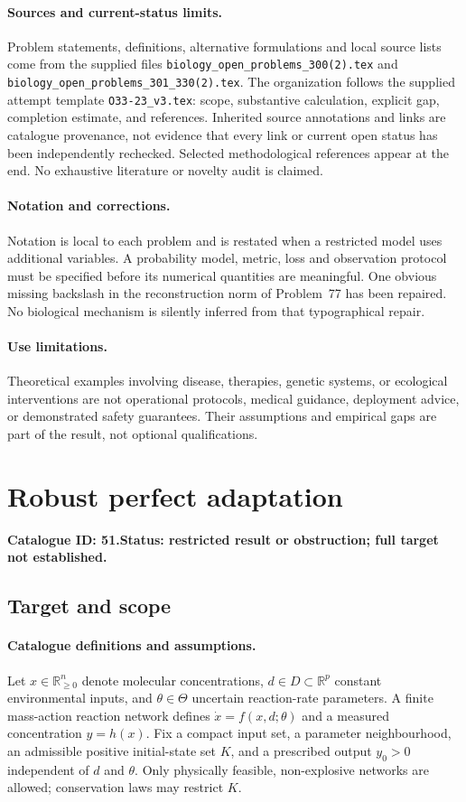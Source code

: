 \documentclass[11pt]{article}
\newcommand{\R}{\mathbb R}
\providecommand{\R}{\mathbb R}
\begin{document}
\paragraph{Sources and current-status limits.}
Problem statements, definitions, alternative formulations and local source lists
come from the supplied files
\texttt{biology\_open\_problems\_300(2).tex} and
\texttt{biology\_open\_problems\_301\_330(2).tex}.
The organization follows the supplied attempt template
\texttt{O33-23\_v3.tex}: scope, substantive calculation, explicit gap,
completion estimate, and references. Inherited source annotations and links are
catalogue provenance, not evidence that every link or current open status has
been independently rechecked. Selected methodological references appear at the
end. No exhaustive literature or novelty audit is claimed.

\paragraph{Notation and corrections.}
Notation is local to each problem and is restated when a restricted model uses
additional variables. A probability model, metric, loss and observation protocol
must be specified before its numerical quantities are meaningful. One obvious
missing backslash in the reconstruction norm of Problem~77 has been repaired.
No biological mechanism is silently inferred from that typographical repair.

\paragraph{Use limitations.}
Theoretical examples involving disease, therapies, genetic systems, or ecological
interventions are not operational protocols, medical guidance, deployment advice,
or demonstrated safety guarantees. Their assumptions and empirical gaps are part
of the result, not optional qualifications.

\setcounter{section}{50}
\section{Robust perfect adaptation}
\label{prob:051}
\noindent\textbf{Catalogue ID: 51.}\quad \textbf{Status: restricted result or obstruction; full target not established.}
\subsection{Target and scope}
\paragraph{Catalogue definitions and assumptions.}
Let $x\in\R_{\ge0}^n$ denote molecular concentrations, $d\in D\subset\R^p$ constant environmental inputs, and $\theta\in\Theta$ uncertain reaction-rate parameters. A finite mass-action reaction network defines $\dot x=f(x,d;\theta)$ and a measured concentration $y=h(x)$. Fix a compact input set, a parameter neighbourhood, an admissible positive initial-state set $K$, and a prescribed output $y_0>0$ independent of $d$ and $\theta$. Only physically feasible, non-explosive networks are allowed; conservation laws may restrict $K$.
\end{document}
